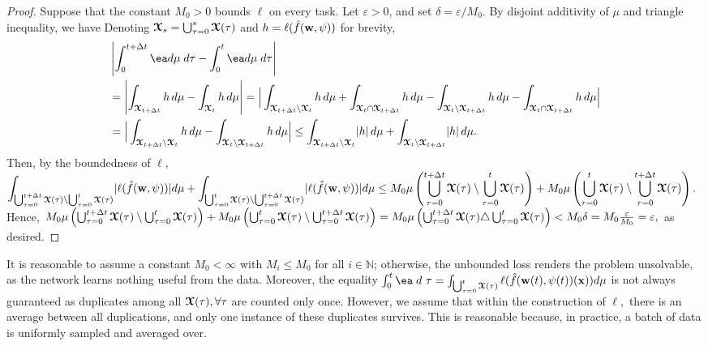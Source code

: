 \begin{proof}
    Suppose that the constant $M_0>0$ bounds $\ell$ on every task. 
    Let $\varepsilon>0$, and  set $\delta = \varepsilon/M_0.$  By disjoint additivity of $\mu$ and triangle inequality, we have
    Denoting $\boldsymbol{\mathcal{X}}_{s} = \bigcup_{\tau=0}^{s}\boldsymbol{\mathcal{X}}(\tau)$ and $h = \ell(\hat{f}(\boldsymbol{\mathrm{w}},\psi))$ for brevity,
    {\small\begin{align*}
       & \left\vert
       \int_0^{t+\Delta t} \ea d\mu\; d\tau -
       \int_0^t \ea d\mu\; d\tau\right\vert \\
        & = \left\vert \int_{\tx_{t+\Delta t}} h\,d\mu - \int_{\tx_{t}} h\,d\mu\right\vert  = \Big\vert \int_{\tx_{t+\Delta t}\setminus \tx_{t}} h\,d\mu + \int_{\tx_{t}\cap\tx_{t+\Delta t}} h\,d\mu
        - \int_{\tx_{t}\setminus \tx_{t+\Delta t}} h\,d\mu - \int_{\tx_{t}\cap \tx_{t+\Delta t}} h\,d\mu\Big\vert\\
        & = \Big\vert \int_{\tx_{t+\Delta t}\setminus \tx_{t}} h\,d\mu - \int_{\tx_{t}\setminus \tx_{t+\Delta t}} h\,d\mu\Big\vert  \leq \int_{\tx_{t+\Delta t}\setminus \tx_{t}} \abs{h}\,d\mu + \int_{\tx_{t}\setminus \tx_{t+\Delta t}} \abs{h}\,d\mu.
    \end{align*}}
    Then, by the boundedness of $\ell,$ $\displaystyle\int_{\bigcup_{\tau = 0}^{t+\Delta t} \boldsymbol{\mathcal{X}}(\tau)\setminus \bigcup_{\tau = 0}^{t} \boldsymbol{\mathcal{X}}(\tau)} \lvert \ell(\hat{f}(\boldsymbol{\mathrm{w}},\psi)) \rvert d\mu+\displaystyle\int_{\bigcup_{\tau = 0}^{t} \boldsymbol{\mathcal{X}}(\tau)\setminus \bigcup_{\tau = 0}^{t+\Delta t} \boldsymbol{\mathcal{X}}(\tau)} \lvert \ell(\hat{f}(\boldsymbol{\mathrm{w}},\psi)) \rvert d\mu \leq M_0 \mu\left(\bigcup_{\tau = 0}^{t+\Delta t} \boldsymbol{\mathcal{X}}(\tau)\setminus \bigcup_{\tau = 0}^{t} \boldsymbol{\mathcal{X}}(\tau)\right) + M_0\mu\left(\bigcup_{\tau = 0}^{t} \boldsymbol{\mathcal{X}}(\tau)\setminus \bigcup_{\tau = 0}^{t+\Delta t} \boldsymbol{\mathcal{X}}(\tau)\right).$
    Hence, $ M_0 \mu\left(\bigcup_{\tau = 0}^{t+\Delta t} \boldsymbol{\mathcal{X}}(\tau)\setminus \bigcup_{\tau = 0}^{t} \boldsymbol{\mathcal{X}}(\tau)\right) + M_0\mu\left(\bigcup_{\tau = 0}^{t} \boldsymbol{\mathcal{X}}(\tau)\setminus \bigcup_{\tau = 0}^{t+\Delta t} \boldsymbol{\mathcal{X}}(\tau)\right) 
    = M_0\mu\left(\bigcup_{\tau = 0}^{t+\Delta t} \boldsymbol{\mathcal{X}}(\tau)\triangle \bigcup_{\tau = 0}^{t} \boldsymbol{\mathcal{X}}(\tau)\right) < M_0\delta= M_0 \frac{\varepsilon}{M_0}
         = \varepsilon,$ as desired.
\end{proof}

\begin{remark}\label{boundedremark}
    It is reasonable to assume a constant $M_0<\infty$ with $M_i\leq M_0$ for all $i\in \mathbb{N}$; otherwise, the unbounded loss renders the problem unsolvable, as the network learns nothing useful from the data. Moreover,
    the equality  $\int_0^t \ea \;  d~\tau  = \int_{ \bigcup_{\tau=0}^t\tx(\tau)} \ell(\fhat(\weight(t),\psi(t))( \vx ) )d\mu$ is not always guaranteed as duplicates among all $\boldsymbol{\mathcal{X}}(\tau), \forall \tau$  are counted only once. However, we assume that within the construction of $\ell,$ there is an average between all duplications, and only one instance of these duplicates survives. This is reasonable because, in practice, a batch of data is uniformly sampled and averaged over.
\end{remark}

